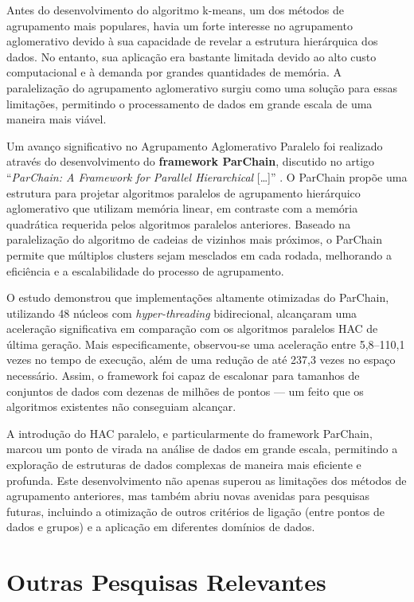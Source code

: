 \documentclass[12pt,
openright, 
oneside, %
a4paper,    %
brazil]{facom-ufu-abntex2}
\begin{document}
Antes do desenvolvimento do algoritmo k-means, um dos métodos de agrupamento mais populares, havia um forte interesse no agrupamento aglomerativo devido à sua capacidade de revelar a estrutura hierárquica dos dados. No entanto, sua aplicação era bastante limitada devido ao alto custo computacional e à demanda por grandes quantidades de memória. A paralelização do agrupamento aglomerativo surgiu como uma solução para essas limitações, permitindo o processamento de dados em grande escala de uma maneira mais viável.

Um avanço significativo no Agrupamento Aglomerativo Paralelo foi realizado através do desenvolvimento do \textbf{framework ParChain}, discutido no artigo \enquote{\textit{ParChain: A Framework for Parallel Hierarchical} [\dots]} \cite{parChainHAC2021}. O ParChain propõe uma estrutura para projetar algoritmos paralelos de agrupamento hierárquico aglomerativo que utilizam memória linear, em contraste com a memória quadrática requerida pelos algoritmos paralelos anteriores. Baseado na paralelização do algoritmo de cadeias de vizinhos mais próximos, o ParChain permite que múltiplos clusters sejam mesclados em cada rodada, melhorando a eficiência e a escalabilidade do processo de agrupamento.

O estudo demonstrou que implementações altamente otimizadas do ParChain, utilizando 48 núcleos com \textit{hyper-threading} bidirecional, alcançaram uma aceleração significativa em comparação com os algoritmos paralelos HAC de última geração. Mais especificamente, observou-se uma aceleração entre 5,8--110,1 vezes no tempo de execução, além de uma redução de até 237,3 vezes no espaço necessário. Assim, o framework foi capaz de escalonar para tamanhos de conjuntos de dados com dezenas de milhões de pontos --- um feito que os algoritmos existentes não conseguiam alcançar.

A introdução do HAC paralelo, e particularmente do framework ParChain, marcou um ponto de virada na análise de dados em grande escala, permitindo a exploração de estruturas de dados complexas de maneira mais eficiente e profunda. Este desenvolvimento não apenas superou as limitações dos métodos de agrupamento anteriores, mas também abriu novas avenidas para pesquisas futuras, incluindo a otimização de outros critérios de ligação (entre pontos de dados e grupos) e a aplicação em diferentes domínios de dados.




\section{Outras Pesquisas Relevantes}
\end{document}
